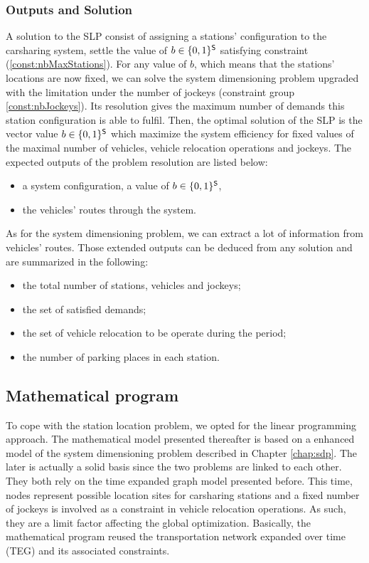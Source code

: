 \begin{bibunit}[ieeetr]
\subsubsection{Outputs and Solution}
A solution to the SLP consist of assigning a stations' configuration to the carsharing system, \ie settle the value of $b \in \{0, 1\}^{\mathsf{S}}$ satisfying constraint (\ref{const:nbMaxStations}).
For any value of $b$, which means that the stations' locations are now fixed, we can solve the system dimensioning problem upgraded with the limitation under the number of jockeys (constraint group \ref{const:nbJockeys}).
Its resolution gives the maximum number of demands this station configuration is able to fulfil.
Then, the optimal solution of the SLP is the vector value $b \in \{0, 1\}^{\mathsf{S}}$ which maximize the system efficiency for fixed values of the maximal number of vehicles, vehicle relocation operations and jockeys.
The expected outputs of the problem resolution are listed below:
\begin{itemize}
\item a system configuration, \ie a value of $b \in \{0, 1\}^{\mathsf{S}}$,
\item the vehicles' routes through the system.
\end{itemize}

\bigskip
As for the system dimensioning problem, we can extract a lot of information from vehicles' routes.
Those extended outputs can be deduced from any solution and are summarized in the following:
\begin{itemize}
\item the total number of stations, vehicles and jockeys;
\item the set of satisfied demands;
\item the set of vehicle relocation to be operate during the period;
\item the number of parking places in each station.
\end{itemize}

\subsection{Mathematical program}

To cope with the station location problem, we opted for the linear programming approach.
The mathematical model presented thereafter is based on a enhanced model of the system dimensioning problem described in Chapter \ref{chap:sdp}.
The later is actually a solid basis since the two problems are linked to each other.
They both rely on the time expanded graph model presented before.
This time, nodes represent possible location sites for carsharing stations and a fixed number of jockeys is involved as a constraint in vehicle relocation operations.
As such, they are a limit factor affecting the global optimization.
Basically, the mathematical program reused the transportation network expanded over time (TEG) and its associated constraints.


\end{bibunit}
